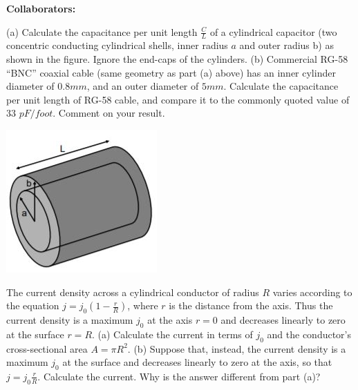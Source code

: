 \documentclass[11pt,letterpaper,boxed]{hmcpset}
\begin{document}
	
	\noindent\textbf{Collaborators:} 
	
	
	\begin{problem} (a) Calculate the capacitance per unit length $\frac{C}{L}$ of a cylindrical capacitor (two concentric conducting cylindrical shells, inner radius $a$ and outer radius b) as shown in the figure. Ignore the end-caps of the cylinders.
(b) Commercial RG-58 “BNC” coaxial cable (same geometry as
part (a) above) has an inner cylinder diameter of $0.8 mm$, and an outer diameter of $5 mm$. Calculate the capacitance per unit length
of RG-58 cable, and compare it to the commonly quoted value of 33 $pF/foot$. Comment on your result.
		\begin{center}
		\includegraphics[scale=.7]{51m7pic.jpg}
		\end{center}
		
	\end{problem}
	
	\begin{solution}
		\vfill
	\end{solution}
	\newpage

	\begin{problem}The current density across a cylindrical conductor of radius $R$ 
	varies according to the equation $j = j_0(1 - \frac{r}{R})$, where $r$ is the distance from the axis. Thus the current density is a maximum $j_0$ at the axis $r = 0$
 and decreases linearly to zero at the surface $r = R$.
(a) Calculate the current in terms of $j_0$ and the conductor’s cross-sectional area $A = \pi R^2$.
(b) Suppose that, instead, the current density is a maximum $j_0$ at the surface and decreases linearly to zero at the axis, so that $j = j_0 \frac{r}{R}$. Calculate the current. Why is the answer different from part (a)?

	\end{problem}
	\begin{solution}
		\vfill
	\end{solution}
	\newpage
\end{document}
